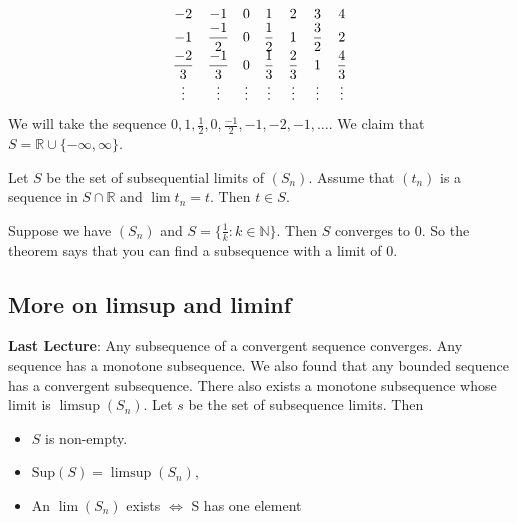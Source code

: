 \documentclass{report}
\begin{document}
\begin{examples}
\begin{example}
\begin{align*}
\begin{array}{ c c c c c c c }
                    -2            & -1            & 0       & 1            & 2            & 3            & 4            \\
                    -1            & \dfrac{-1}{2} & 0       & \dfrac{1}{2} & 1            & \dfrac{3}{2} & 2            \\
                    \dfrac{-2}{3} & \dfrac{-1}{3} & 0       & \dfrac{1}{3} & \dfrac{2}{3} & 1            & \dfrac{4}{3} \\
                    \vdots        & \vdots        & \vdots  & \vdots       & \vdots       & \vdots       & \vdots         
                \end{array}
            \end{align*}
        We will take the sequence $0, 1, \frac{1}{2}, 0, \frac{-1}{2}, -1, -2, -1, \ldots $. We claim that $S = \mathbb{R} \cup \{-\infty, \infty\}$.
    \end{example}
\end{examples}

\begin{theorem}{11.9}
    Let $S$ be the set of subsequential limits of $(S_{n})$. Assume that $(t_{n})$ is a sequence in $S \cap \mathbb{R}$ and $\lim t_{n} = t$. Then $t \in S$.
\end{theorem}

\begin{examples}
    \begin{example}
        Suppose we have $(S_{n})$ and $S = \{\frac{1}{k}: k \in \mathbb{N}\}$. Then $S$ converges to $0$. So the theorem says that you can find a subsequence with a limit of $0$.
    \end{example}
\end{examples}

\begin{topic}
    \section{More on limsup and liminf}
\end{topic}

\textbf{Last Lecture}: Any subsequence of a convergent sequence converges. Any sequence has a monotone subsequence. We also found that any bounded sequence has a convergent subsequence. There also exists a monotone subsequence whose limit is $\limsup (S_{n})$. Let $s$ be the set of subsequence limits. Then
    \begin{itemize}
        \item $S$ is non-empty.

        \item $\text{Sup}(S) = \limsup (S_{n})$, 

        \item An $\lim (S_{n})$ exists $\iff $ S has one element
    \end{itemize} 
\end{document}
